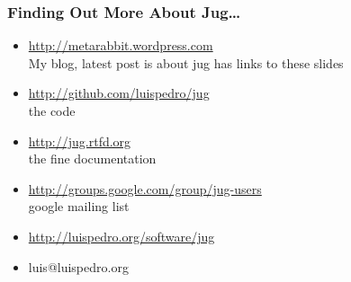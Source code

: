 \documentclass{beamer}
\begin{document}
\begin{frame}[fragile]
\frametitle{Finding Out More About Jug\ldots}
\begin{itemize}
\item \url{http://metarabbit.wordpress.com}\\My blog, latest post is about jug \alert{has links to these slides}
\item \url{http://github.com/luispedro/jug}\\the code
\item \url{http://jug.rtfd.org}\\the fine documentation
\item \url{http://groups.google.com/group/jug-users}\\google mailing list
\item \url{http://luispedro.org/software/jug}
\item luis@luispedro.org
\end{itemize}

\end{frame}
\end{document}
